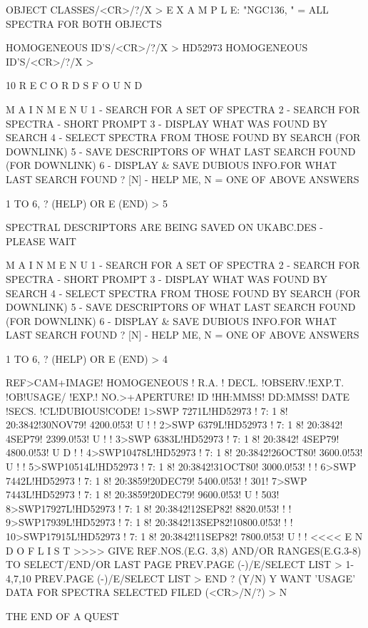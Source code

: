 \documentclass[11pt,nolof,noabs]{starlink}
\begin{document}
\begin{footnotesize}
\begin{terminalv}
OBJECT CLASSES/<CR>/?/X >
                                E X A M P L E:
               "NGC136, "    =   ALL SPECTRA FOR BOTH OBJECTS

HOMOGENEOUS ID'S/<CR>/?/X > HD52973
HOMOGENEOUS ID'S/<CR>/?/X >

                          10   R E C O R D S      F O U N D

                            M A I N     M E N U
        1      -      SEARCH FOR A SET OF SPECTRA
        2      -      SEARCH FOR SPECTRA - SHORT PROMPT
        3      -      DISPLAY WHAT WAS FOUND BY SEARCH
        4      -      SELECT SPECTRA FROM THOSE FOUND BY SEARCH (FOR DOWNLINK)
        5      -      SAVE DESCRIPTORS OF WHAT LAST SEARCH FOUND (FOR DOWNLINK)
        6      -      DISPLAY & SAVE DUBIOUS INFO.FOR WHAT LAST SEARCH FOUND
        ? [N]  -      HELP ME, N = ONE OF ABOVE ANSWERS

1 TO 6, ? (HELP) OR  E (END) > 5

        SPECTRAL DESCRIPTORS ARE BEING SAVED ON UKABC.DES - PLEASE WAIT

                            M A I N     M E N U
        1      -      SEARCH FOR A SET OF SPECTRA
        2      -      SEARCH FOR SPECTRA - SHORT PROMPT
        3      -      DISPLAY WHAT WAS FOUND BY SEARCH
        4      -      SELECT SPECTRA FROM THOSE FOUND BY SEARCH (FOR DOWNLINK)
        5      -      SAVE DESCRIPTORS OF WHAT LAST SEARCH FOUND (FOR DOWNLINK)
        6      -      DISPLAY & SAVE DUBIOUS INFO.FOR WHAT LAST SEARCH FOUND
        ? [N]  -      HELP ME, N = ONE OF ABOVE ANSWERS

1 TO 6, ? (HELP) OR  E (END) > 4

REF>CAM+IMAGE!   HOMOGENEOUS  !  R.A. !  DECL. !OBSERV.!EXP.T. !OB!USAGE/ !EXP.!
NO.>+APERTURE!       ID       !HH:MMSS! DD:MMSS! DATE  !SECS.  !CL!DUBIOUS!CODE!
  1>SWP 7271L!HD52973         ! 7: 1 8! 20:3842!30NOV79! 4200.0!53! U     !    !
  2>SWP 6379L!HD52973         ! 7: 1 8! 20:3842! 4SEP79! 2399.0!53! U     !    !
  3>SWP 6383L!HD52973         ! 7: 1 8! 20:3842! 4SEP79! 4800.0!53! U  D  !    !
  4>SWP10478L!HD52973         ! 7: 1 8! 20:3842!26OCT80! 3600.0!53! U     !    !
  5>SWP10514L!HD52973         ! 7: 1 8! 20:3842!31OCT80! 3000.0!53!       !    !
  6>SWP 7442L!HD52973         ! 7: 1 8! 20:3859!20DEC79! 5400.0!53!       ! 301!
  7>SWP 7443L!HD52973         ! 7: 1 8! 20:3859!20DEC79! 9600.0!53! U     ! 503!
  8>SWP17927L!HD52973         ! 7: 1 8! 20:3842!12SEP82! 8820.0!53!       !    !
  9>SWP17939L!HD52973         ! 7: 1 8! 20:3842!13SEP82!10800.0!53!       !    !
 10>SWP17915L!HD52973         ! 7: 1 8! 20:3842!11SEP82! 7800.0!53! U     !    !
                      <<<<  E N D    O F    L I S T  >>>>
   GIVE REF.NOS.(E.G. 3,8) AND/OR RANGES(E.G.3-8) TO SELECT/END/OR LAST PAGE
PREV.PAGE (-)/E/SELECT LIST > 1-4,7,10
PREV.PAGE (-)/E/SELECT LIST >
 END ? (Y/N) Y
WANT 'USAGE' DATA FOR SPECTRA SELECTED FILED (<CR>/N/?) > N

               THE END OF A QUEST
\end{terminalv}
\end{footnotesize}
\end{document}
